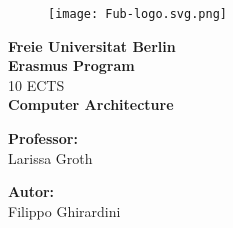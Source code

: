 \begin{titlepage} %
\begin{figure}[t] %
    \centering\texttt{[image: Fub-logo.svg.png]}
\end{figure}
\vspace{20mm}

\begin{Large}
 \begin{center}
	\textbf{Freie Universitat Berlin\\ Erasmus Program\\}
	\vspace{20mm}
    {\LARGE{10 ECTS}}\\
	\vspace{10mm}
	{\huge{\bf Computer Architecture}}\\
\end{center}
\end{Large}


\vspace{36mm}
\begin{minipage}[t]{0.47\textwidth}
	{\large{\bf Professor:}\\ \large{Larissa Groth}}
\end{minipage}
\hfill
\begin{minipage}[t]{0.47\textwidth}\raggedleft
	{\large{\bf Autor:}\\ \large{Filippo Ghirardini}}
\end{minipage}

\vspace{25mm}

\hrulefill

\vspace{5mm}


\end{titlepage}